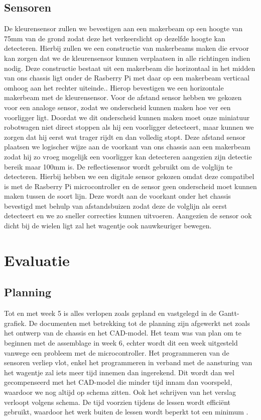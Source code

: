 \documentclass[a4paper,kulak]{kulakarticle}
\begin{document}
\subsection{Sensoren}
De kleurensensor zullen we bevestigen aan een makerbeam op een hoogte van 75mm van de grond zodat deze het verkeerslicht op dezelfde hoogte kan detecteren. Hierbij zullen we een constructie van makerbeams maken die ervoor kan zorgen dat we de kleurensensor kunnen verplaatsen in alle richtingen indien nodig. Deze constructie bestaat uit een makerbeam die horizontaal in het midden van ons chassis ligt onder de Rasberry Pi met daar op een makerbeam verticaal omhoog aan het rechter uiteinde.. Hierop bevestigen we een horizontale makerbeam met de kleurensensor. 
Voor de afstand sensor hebben we gekozen voor een analoge sensor, zodat we onderscheid kunnen maken hoe ver een voorligger ligt. Doordat we dit onderscheid kunnen maken moet onze miniatuur robotwagen niet direct stoppen als hij een voorligger detecteert, maar kunnen we zorgen dat hij eerst wat trager rijdt en dan volledig stopt. Deze afstand sensor plaatsen we logischer wijze aan de voorkant van ons chassis aan een makerbeam zodat hij zo vroeg mogelijk een voorligger kan detecteren aangezien zijn detectie bereik maar 100mm is. 
De reflectiesensor wordt gebruikt om de volglijn te detecteren. Hierbij hebben we een digitale sensor gekozen omdat deze compatibel is met de Rasberry Pi microcontroller en de sensor geen onderscheid moet kunnen maken tussen de soort lijn. Deze wordt aan de voorkant onder het chassis bevestigd met behulp van afstandsbuizen zodat deze de volglijn als eerst detecteert en we zo sneller correcties kunnen uitvoeren. Aangezien de sensor ook dicht bij de wielen ligt zal het wagentje ook nauwkeuriger bewegen.
\section{Evaluatie}

\subsection{Planning}

Tot en met week 5 is alles verlopen zoals gepland en vastgelegd in de Gantt-grafiek. De documenten met betrekking tot de planning zijn afgewerkt net zoals het ontwerp van de chassis en het CAD-model. Het team was van plan om te beginnen met de assemblage in week 6, echter wordt dit een week uitgesteld vanwege een probleem met de microcontroller. Het programmeren van de sensoren verliep vlot, enkel het programmeren in verband met de aansturing van het wagentje zal iets meer tijd innemen dan ingerekend. Dit wordt dan wel gecompenseerd met het CAD-model die minder tijd innam dan voorspeld, waardoor we nog altijd op schema zitten. Ook het schrijven van het verslag verloopt volgens schema. De tijd voorzien tijdens de lessen wordt efficiënt gebruikt, waardoor het werk buiten de lessen wordt beperkt tot een minimum \cite{opgave}.
\end{document}
